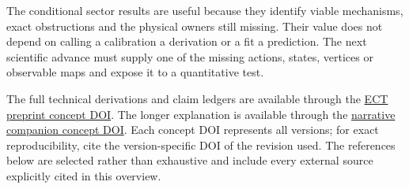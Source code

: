 \documentclass[11pt,a4paper]{article}
\begin{document}
The conditional sector results are useful because they identify viable
mechanisms, exact obstructions and the physical owners still missing.  Their
value does not depend on calling a calibration a derivation or a fit a
prediction.  The next scientific advance must supply one of the missing
actions, states, vertices or observable maps and expose it to a quantitative
test.

The full technical derivations and claim ledgers are available through the
\href{https://doi.org/10.5281/zenodo.18917929}{ECT preprint concept DOI}.
The longer explanation is available through the
\href{https://doi.org/10.5281/zenodo.19430795}{narrative companion concept DOI}.
Each concept DOI represents all versions; for exact reproducibility, cite the
version-specific DOI of the revision used.
The references below are selected rather than exhaustive and include every
external source explicitly cited in this overview.

\begingroup
\small
\renewcommand{\refname}{Selected references}


\endgroup
\end{document}
